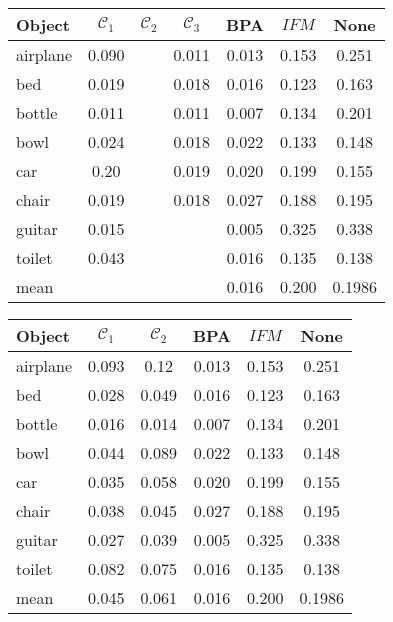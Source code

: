 \begin{center}
     \label{tab:distance256} 
    \begin{tabular}{| l  | c  | c | c | c | c || c |}
        \hline
        Object& $\mathcal{C}_1$ & $\mathcal{C}_2$ & $\mathcal{C}_3$ & BPA & $IFM$  & None\\ \hline
        airplane&0.090&&0.011&0.013&0.153&0.251\\\hline
        bed&0.019&&0.018&0.016&0.123&0.163\\\hline 
        bottle&0.011&&0.011&0.007&0.134&0.201\\\hline
        bowl&0.024&&0.018&0.022&0.133&0.148\\\hline
        car&0.20&&0.019&0.020&0.199&0.155\\\hline
        chair&0.019&&0.018&0.027&0.188&0.195\\\hline
        guitar&0.015&&&0.005&0.325&0.338\\\hline
        toilet&0.043&&&0.016&0.135&0.138\\\hline\hline
        mean&&&&0.016&0.200&0.1986\\        \hline
    \end{tabular}
\end{center}

\begin{center}
     \label{tab:distance256} 
    \begin{tabular}{| l  | c  | c | c | c || c |}
        \hline
        Object& $\mathcal{C}_1$ & $\mathcal{C}_2$ & BPA & $IFM$  & None\\ \hline
        airplane&0.093&0.12&0.013&0.153&0.251\\\hline
        bed&0.028&0.049&0.016&0.123&0.163\\\hline 
        bottle&0.016&0.014&0.007&0.134&0.201\\\hline
        bowl&0.044&0.089&0.022&0.133&0.148\\\hline
        car&0.035&0.058&0.020&0.199&0.155\\\hline
        chair&0.038&0.045&0.027&0.188&0.195\\\hline
        guitar&0.027&0.039&0.005&0.325&0.338\\\hline
        toilet&0.082&0.075&0.016&0.135&0.138\\\hline\hline
        mean&0.045&0.061&0.016&0.200&0.1986\\        \hline
    \end{tabular}
\end{center}

